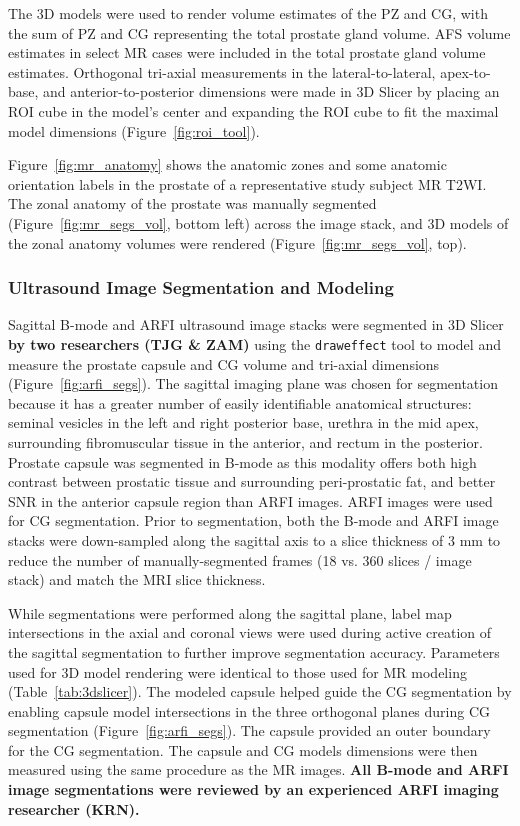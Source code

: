 The 3D models were used to render volume estimates of the PZ and CG, with the
sum of PZ and CG representing the total prostate gland volume. AFS volume
estimates in select MR cases were included in the total prostate gland volume
estimates. Orthogonal tri-axial measurements in the lateral-to-lateral,
apex-to-base, and anterior-to-posterior dimensions were made in 3D Slicer by
placing an ROI cube in the model's center and expanding the ROI cube to fit the
maximal model dimensions (Figure~\ref{fig:roi_tool}). 



Figure~\ref{fig:mr_anatomy} shows the anatomic zones and some anatomic
orientation labels in the prostate of a representative study subject MR T2WI.
The zonal anatomy of the prostate was manually segmented
(Figure~\ref{fig:mr_segs_vol}, bottom left) across the image stack, and 3D
models of the zonal anatomy volumes were rendered
(Figure~\ref{fig:mr_segs_vol}, top).



\subsubsection{Ultrasound Image Segmentation and Modeling}
Sagittal B-mode and ARFI ultrasound image stacks were segmented in 3D Slicer
\textbf{by two researchers (TJG \& ZAM)} using the \verb+draweffect+ tool to
model and measure the prostate capsule and CG volume and tri-axial dimensions
(Figure~\ref{fig:arfi_segs}).   The sagittal imaging plane was chosen for
segmentation because it has a greater number of easily identifiable anatomical
structures:  seminal vesicles in the left and right posterior base, urethra in
the mid apex, surrounding fibromuscular tissue in the anterior, and rectum in
the posterior. Prostate capsule was segmented in B-mode as this modality offers
both high contrast between prostatic tissue and surrounding peri-prostatic fat,
and better SNR in the anterior capsule region than ARFI images. ARFI images
were used for CG segmentation.  Prior to segmentation, both the B-mode and ARFI
image stacks were down-sampled along the sagittal axis to a slice thickness of
3 mm to reduce the number of manually-segmented frames (18 vs. 360 slices /
image stack) and match the MRI slice thickness. 

While segmentations were performed along the sagittal plane, label map
intersections in the axial and coronal views were used during active creation
of the sagittal segmentation to further improve segmentation accuracy.
Parameters used for 3D model rendering were identical to those used for MR
modeling (Table~\ref{tab:3dslicer}).  The modeled capsule helped guide the CG
segmentation by enabling capsule model intersections in the three orthogonal
planes during CG segmentation (Figure~\ref{fig:arfi_segs}). The capsule
provided an outer boundary for the CG segmentation. The capsule and CG models
dimensions were then measured using the same procedure as the MR images.
\textbf{All B-mode and ARFI image segmentations were reviewed by an experienced
    ARFI imaging researcher (KRN).}



